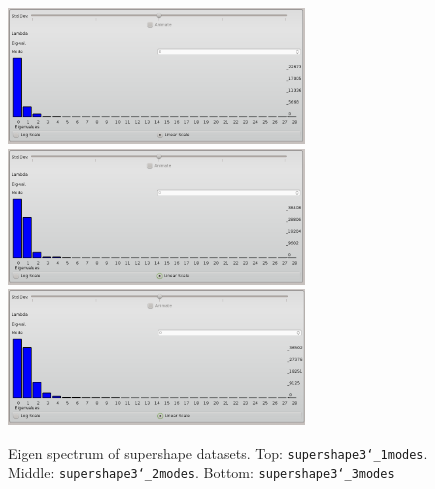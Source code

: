 \documentclass[letterpaper,12pt]{article}   %
\begin{document}
\vspace{0.1in}
\begin{figure}[!htp]
\centering
\includegraphics[width=0.7\textwidth]{figs/supershapes_1mode_spectrum.png}\vspace{0.1in}\\
\includegraphics[width=0.7\textwidth]{figs/supershapes_2mode_spectrum.png}\vspace{0.1in}\\
\includegraphics[width=0.7\textwidth]{figs/supershapes_3mode_spectrum.png}
\caption{Eigen spectrum of supershape datasets. Top: \texttt{supershape3\char`_1modes}. Middle: \texttt{supershape3\char`_2modes}. Bottom: \texttt{supershape3\char`_3modes} }
\label{fig:supershape_spectrums}
\end{figure}
\end{document}
